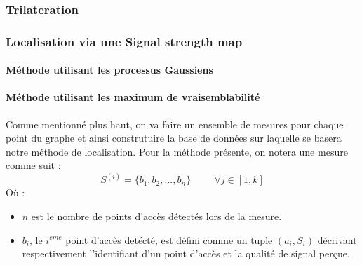 \documentclass[11pt,journal,compsoc]{IEEEtran}
\begin{document}
    \subsubsection{Trilateration}
    \subsubsection{Localisation via une Signal strength map}
      \paragraph{Méthode utilisant les processus Gaussiens}
      \paragraph{Méthode utilisant les maximum de vraisemblabilité}
        Comme mentionné plus haut, on va faire un ensemble de mesures pour chaque point du graphe et ainsi construtuire la base de données sur laquelle se basera notre méthode de localisation. Pour la méthode présente, on notera une mesure comme suit :
        \begin{equation}
          S^{(i)}=\{b_{1}, b_{2}, ..., b_{n}\} \hspace{1cm} \forall j \in [1, k]
        \end{equation}
        Où :
        \begin{itemize}
          \item $n$ est le nombre de points d'accès détectés lors de la mesure.
          \item $b_{i}$, le $i^{eme}$ point d'accès detécté, est défini comme un tuple $(a_{i}, S_{i})$ décrivant respectivement l'identifiant d'un point d'accès et la qualité de signal perçue.
        \end{itemize}
        
\end{document}
